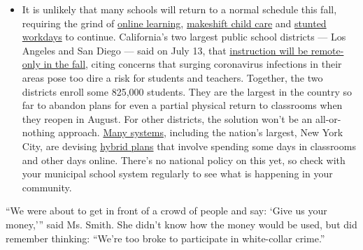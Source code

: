 \begin{itemize}
  \begin{itemize}
  \tightlist
  \item
    It is unlikely that many schools will return to a normal schedule
    this fall, requiring the grind of
    \href{https://www.nytimes3xbfgragh.onion/2020/06/05/us/coronavirus-education-lost-learning.html?action=click\&pgtype=Article\&state=default\&region=MAIN_CONTENT_3\&context=storylines_faq}{online
    learning},
    \href{https://www.nytimes3xbfgragh.onion/2020/05/29/us/coronavirus-child-care-centers.html?action=click\&pgtype=Article\&state=default\&region=MAIN_CONTENT_3\&context=storylines_faq}{makeshift
    child care} and
    \href{https://www.nytimes3xbfgragh.onion/2020/06/03/business/economy/coronavirus-working-women.html?action=click\&pgtype=Article\&state=default\&region=MAIN_CONTENT_3\&context=storylines_faq}{stunted
    workdays} to continue. California's two largest public school
    districts --- Los Angeles and San Diego --- said on July 13, that
    \href{https://www.nytimes3xbfgragh.onion/2020/07/13/us/lausd-san-diego-school-reopening.html?action=click\&pgtype=Article\&state=default\&region=MAIN_CONTENT_3\&context=storylines_faq}{instruction
    will be remote-only in the fall}, citing concerns that surging
    coronavirus infections in their areas pose too dire a risk for
    students and teachers. Together, the two districts enroll some
    825,000 students. They are the largest in the country so far to
    abandon plans for even a partial physical return to classrooms when
    they reopen in August. For other districts, the solution won't be an
    all-or-nothing approach.
    \href{https://bioethics.jhu.edu/research-and-outreach/projects/eschool-initiative/school-policy-tracker/}{Many
    systems}, including the nation's largest, New York City, are
    devising
    \href{https://www.nytimes3xbfgragh.onion/2020/06/26/us/coronavirus-schools-reopen-fall.html?action=click\&pgtype=Article\&state=default\&region=MAIN_CONTENT_3\&context=storylines_faq}{hybrid
    plans} that involve spending some days in classrooms and other days
    online. There's no national policy on this yet, so check with your
    municipal school system regularly to see what is happening in your
    community.
  \end{itemize}
\end{itemize}

``We were about to get in front of a crowd of people and say: `Give us
your money,''' said Ms. Smith. She didn't know how the money would be
used, but did remember thinking: ``We're too broke to participate in
white-collar crime.''

